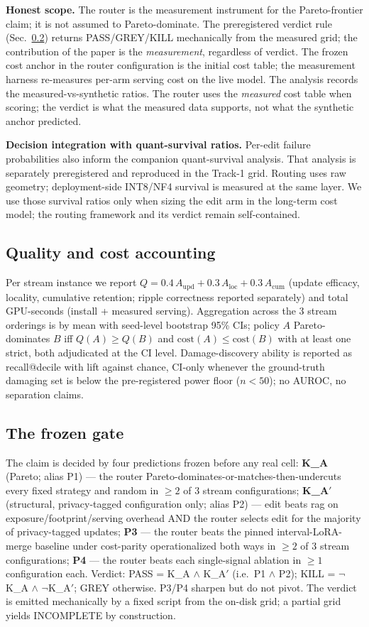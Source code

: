 \documentclass[preprint,12pt]{elsarticle}
\begin{document}
\textbf{Honest scope.} The router is the measurement instrument for the
Pareto-frontier claim; it is not assumed to Pareto-dominate.
The preregistered verdict rule (Sec.~\ref{sec:gate}) returns PASS/GREY/KILL
mechanically from the measured grid; the contribution of the paper is the
\emph{measurement}, regardless of verdict. The frozen cost anchor in the
router configuration is the initial cost table; the measurement harness re-measures
per-arm serving cost on the live model. The analysis records the
measured-vs-synthetic ratios.
The router uses the \emph{measured} cost table when scoring; the verdict is
what the measured data supports, not what the synthetic anchor predicted.

\textbf{Decision integration with quant-survival ratios.} Per-edit failure
probabilities also inform the companion quant-survival analysis. That analysis is
separately preregistered and reproduced in the Track-1 grid. Routing uses raw
geometry; deployment-side INT8/NF4 survival is measured at the same layer. We use
those survival ratios only when sizing the edit arm in the long-term cost model;
the routing framework and its verdict remain self-contained.

\subsection{Quality and cost accounting}
\label{sec:metrics}
Per stream instance we report $Q = 0.4\,A_{\mathrm{upd}} + 0.3\,A_{\mathrm{loc}} +
0.3\,A_{\mathrm{cum}}$ (update efficacy, locality, cumulative retention; ripple
correctness reported separately) and total GPU-seconds (install + measured serving).
Aggregation across the 3 stream orderings is by mean with seed-level bootstrap 95\%
CIs; policy $A$ Pareto-dominates $B$ iff $Q(A) \ge Q(B)$ and
$\mathrm{cost}(A) \le \mathrm{cost}(B)$ with at least one strict, both adjudicated
at the CI level. Damage-discovery ability is reported as recall@decile with lift
against chance, CI-only whenever the ground-truth damaging set is below the
pre-registered power floor ($n{<}50$); no AUROC, no separation claims.

\subsection{The frozen gate}
\label{sec:gate}
The claim is decided by four predictions frozen before any real cell:
\textbf{K\_A} (Pareto; alias P1) — the router Pareto-dominates-or-matches-then-undercuts every
fixed strategy and random in $\ge 2$ of 3 stream configurations;
\textbf{K\_A$'$} (structural, privacy-tagged configuration only; alias P2) — edit beats rag on exposure/footprint/serving
overhead AND the router selects edit for the majority of privacy-tagged updates;
\textbf{P3} — the router beats the pinned interval-LoRA-merge baseline under
cost-parity operationalized both ways in $\ge 2$ of 3 stream configurations;
\textbf{P4} — the router beats each single-signal ablation in $\ge 1$ configuration each.
Verdict: PASS = K\_A $\wedge$ K\_A$'$ (i.e.\ P1 $\wedge$ P2); KILL = $\neg$K\_A $\wedge$ $\neg$K\_A$'$; GREY otherwise.
P3/P4 sharpen but do not pivot. The verdict is emitted mechanically by a fixed
script from the on-disk grid; a partial grid yields INCOMPLETE by construction.
\end{document}
